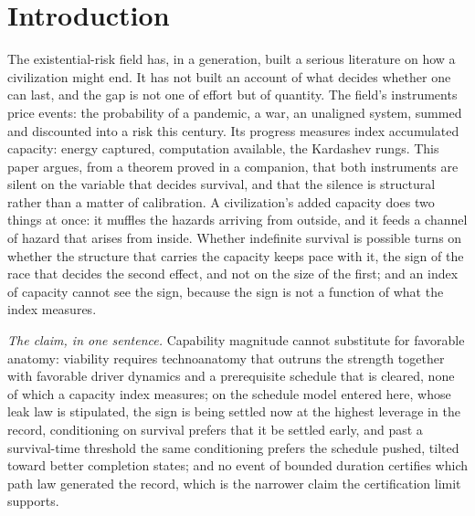 \section{Introduction}\label{sec:intro}

The existential-risk field has, in a generation, built a serious
literature on how a civilization might end. It has not built an account
of what decides whether one can last, and the gap is not one of effort
but of quantity. The field's instruments price events: the probability
of a pandemic, a war, an unaligned system, summed and discounted into a
risk this century. Its progress measures index accumulated capacity:
energy captured, computation available, the Kardashev rungs. This paper
argues, from a theorem proved in a companion, that both instruments are
silent on the variable that decides survival, and that the silence is
structural rather than a matter of calibration. A civilization's added
capacity does two things at once: it muffles the hazards arriving from
outside, and it feeds a channel of hazard that arises from inside.
Whether indefinite survival is possible turns on whether the structure
that carries the capacity keeps pace with it, the sign of the race that
decides the second effect, and not on the size of the first; and an
index of capacity cannot see the sign, because the sign is not a
function of what the index measures.

\emph{The claim, in one sentence.} Capability magnitude cannot
substitute for favorable anatomy: viability requires technoanatomy that
outruns the strength together with favorable driver dynamics and a prerequisite
schedule that is cleared, none of which a capacity index measures; on
the schedule model entered here, whose leak law is stipulated, the sign
is being settled now at the highest leverage in the record, conditioning
on survival prefers that it be settled early, and past a survival-time
threshold the same conditioning prefers the schedule pushed, tilted
toward better completion states; and no event of bounded duration certifies which path law generated the record, which is the narrower claim the certification limit supports.

